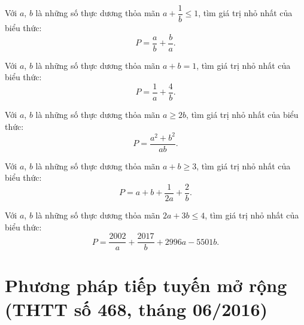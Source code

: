 {\begin{bt}%
	Với $a$, $b$ là những số thực dương thỏa mãn $a+\dfrac{1}{b} \leq 1$, tìm giá trị nhỏ nhất của biểu thức:
	\begin{equation*}
	P=\dfrac{a}{b}+\dfrac{b}{a}.
	\end{equation*}
	
\end{bt}

\begin{bt}%
	Với $a$, $b$ là những số thực dương thỏa mãn $a+b= 1$, tìm giá trị nhỏ nhất của biểu thức:
	\begin{equation*}
	P=\dfrac{1}{a}+\dfrac{4}{b}.
	\end{equation*}
\end{bt}

\begin{bt}%
	Với $a$, $b$ là những số thực dương thỏa mãn $a\geq 2b$, tìm giá trị nhỏ nhất của biểu thức:
	\begin{equation*}
	P=\dfrac{a^2+b^2}{ab}.
	\end{equation*}
	
\end{bt}

\begin{bt}%
	Với $a$, $b$ là những số thực dương thỏa mãn $a+b \geq 3$, tìm giá trị nhỏ nhất của biểu thức:
	\begin{equation*}
	P=a+b+\dfrac{1}{2a}+\dfrac{2}{b}.
	\end{equation*}
\end{bt}

\begin{bt}%
	Với $a$, $b$ là những số thực dương thỏa mãn $2a+3b \leq 4$, tìm giá trị nhỏ nhất của biểu thức:
	\begin{equation*}
	P=\dfrac{2002}{a}+\dfrac{2017}{b}+2996a -5501b.
	\end{equation*}
\end{bt}
\section{Phương pháp tiếp tuyến mở rộng (THTT số 468, tháng 06/2016)}
\begin{center}
	\textbf{\color{violet}{Đặng Xuân Sơn và Lớp chuyên Tin khóa $2014-2017$\\
			(THPT chuyên Trần Phú, Hải Phòng)}}
\end{center}
}
